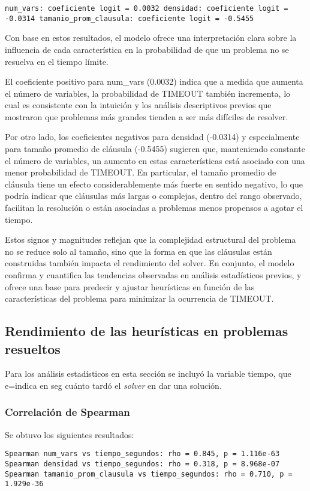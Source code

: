 \texttt{num\_vars: coeficiente logit = 0.0032
densidad: coeficiente logit = -0.0314
tamanio\_prom\_clausula: coeficiente logit = -0.5455}

Con base en estos resultados, el modelo ofrece una interpretación clara sobre la influencia de cada característica en la probabilidad de que un problema no se resuelva en el tiempo límite.

El coeficiente positivo para num\_vars (0.0032) indica que a medida que aumenta el número de variables, la probabilidad de TIMEOUT también incrementa, lo cual es consistente con la intuición y los análisis descriptivos previos que mostraron que problemas más grandes tienden a ser más difíciles de resolver. 

Por otro lado, los coeficientes negativos para densidad (-0.0314) y especialmente para tamaño promedio de cláusula (-0.5455) sugieren que, manteniendo constante el número de variables, un aumento en estas características está asociado con una menor probabilidad de TIMEOUT. En particular, el tamaño promedio de cláusula tiene un efecto considerablemente más fuerte en sentido negativo, lo que podría indicar que cláusulas más largas o complejas, dentro del rango observado, facilitan la resolución o están asociadas a problemas menos propensos a agotar el tiempo.

Estos signos y magnitudes reflejan que la complejidad estructural del problema no se reduce solo al tamaño, sino que la forma en que las cláusulas están construidas también impacta el rendimiento del solver. En conjunto, el modelo confirma y cuantifica las tendencias observadas en análisis estadísticos previos, y ofrece una base para predecir y ajustar heurísticas en función de las características del problema para minimizar la ocurrencia de TIMEOUT.

\subsection{Rendimiento de las heur\'isticas en problemas resueltos}
Para los an\'alisis estad\'isticos en esta secci\'on se incluy\'o la variable tiempo, que e=indica en seg cu\'anto tard\'o el \textit{solver} en dar una soluci\'on.

\subsubsection{Correlaci\'on de Spearman}
Se obtuvo los siguientes resultados:

\texttt{Spearman num\_vars vs tiempo\_segundos: rho = 0.845, p = 1.116e-63
Spearman densidad vs tiempo\_segundos: rho = 0.318, p = 8.968e-07
Spearman tamanio\_prom\_clausula vs tiempo\_segundos: rho = 0.710, p = 1.929e-36}

